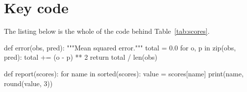 \documentclass[10pt,journal]{IEEEtran}
\begin{document}
  
  

  \appendices
  \section{Key code}
  The listing below is the whole of the code behind Table~\ref{tab:scores}.

  \begin{code}[lang=python, numbers=true]
def error(obs, pred):
    """Mean squared error."""
    total = 0.0
    for o, p in zip(obs, pred):
        total += (o - p) ** 2
    return total / len(obs)


def report(scores):
    for name in sorted(scores):
        value = scores[name]
        print(name, round(value, 3))
  \end{code}
\end{document}
